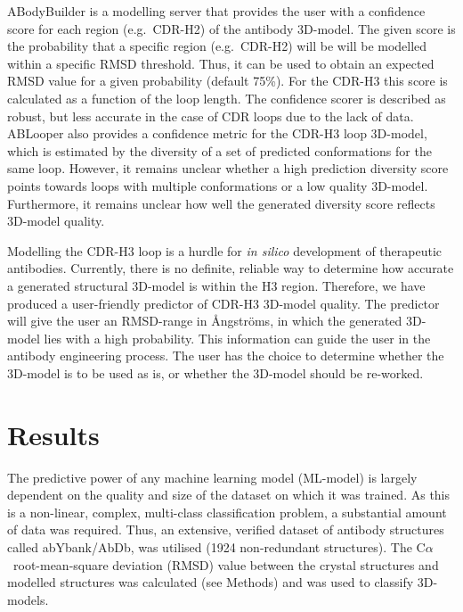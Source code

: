 \documentclass[12pt]{article}
\newcommand{\ca}{\mbox{C$\alpha$}}
\begin{document}
ABodyBuilder is a modelling server that provides the user with a
confidence score for each region (e.g.\ CDR-H2) of the antibody
3D-model. The given score is the probability that a specific region
(e.g.\ CDR-H2) will be will be modelled within a specific RMSD
threshold\cite{Leem2016}. Thus, it can be used to obtain an expected
RMSD value for a given probability (default 75\%). For the CDR-H3 this
score is calculated as a function of the loop length.  The confidence
scorer is described as robust, but less accurate in the case of CDR
loops due to the lack of data\cite{Leem2016}. ABLooper also provides a
confidence metric for the CDR-H3 loop 3D-model, which is estimated by the
diversity of a set of predicted conformations for the same
loop\cite{Abanades2022}. However, it remains unclear whether a high
prediction diversity score points towards loops with multiple
conformations or a low quality 3D-model. Furthermore, it remains unclear
how well the generated diversity score reflects 3D-model
quality\cite{Abanades2022}.


Modelling the CDR-H3 loop is a hurdle for \emph{in silico} development of
therapeutic antibodies. Currently, there is no definite, reliable way
to determine how accurate a generated structural 3D-model is within the
H3 region. Therefore, we have produced a
user-friendly predictor of CDR-H3 3D-model quality. The predictor will give
the user an RMSD-range in {\AA}ngstr\"{o}ms, in which the generated 3D-model lies
with a high probability.
This information can guide the
user in the antibody engineering process. The user has the choice to
determine whether the 3D-model is to be used as is, or
whether the 3D-model should be re-worked.

\section{Results}

The predictive power of any machine learning model (ML-model) is largely
dependent on the quality and size of the dataset on which it was trained. As
this is a non-linear, complex, multi-class classification problem, a
substantial amount of data was required. Thus, an extensive, verified
dataset of antibody structures called abYbank/AbDb\cite{Ferdous2018},
was utilised (1924 non-redundant
structures). The \ca\ root-mean-square deviation (RMSD) value
between the crystal structures
and modelled structures was calculated (see Methods) and
was used to classify 3D-models.
\end{document}
